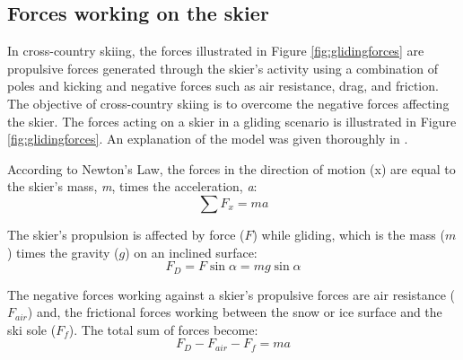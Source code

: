 \subsection{Forces working on the skier}
\label{subsec:forces}
In cross-country skiing, the forces illustrated in Figure \ref{fig:glidingforces} are propulsive forces generated through the skier's activity using a combination of poles and kicking and negative forces such as air resistance, drag, and friction. The objective of cross-country skiing is to overcome the negative forces affecting the skier. The forces acting on a skier in a gliding scenario is illustrated in Figure \ref{fig:glidingforces}. An explanation of the model was given thoroughly in \citep{breitschadel_technical_2014}.

According to Newton's  Law, the forces in the direction of motion (x) are equal to the skier's mass, \textit{m}, times the acceleration, \textit{a}:
\begin{equation}\label{eqn:newtion2nd}
    \sum F_x = ma
\end{equation}

The skier's propulsion is affected by force ($F$) while gliding, which is the mass ($m$) times the gravity ($g$) on an inclined surface:
\begin{equation}
    F_D = F \sin\alpha = mg\sin\alpha
\end{equation}

The negative forces working against a skier's propulsive forces are air resistance ($F_{air}$) and, the frictional forces working between the snow or ice surface and the ski sole ($F_f$). The total sum of forces become:
\begin{equation}
    F_D - F_{air} - F_f = ma
\end{equation}


